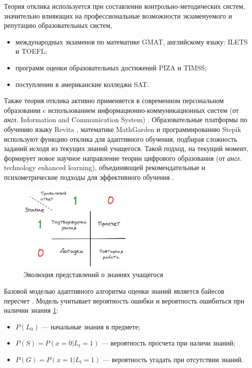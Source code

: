 Теория отклика используется при составлении контрольно-методических систем, значительно влияющих на 
профессиональные возможности экзаменуемого и репутацию образовательных систем,
\begin{itemize}
    \item международных экзаменов по математике GMAT, английскому языку: ILETS и TOEFL;
    \item программ оценки образовательных достижений PIZA и TIMSS;
    \item поступлении в американские колледжи SAT.  
\end{itemize}
Также теория отклика активно применяется  в современном персональном образовании c использованием 
информационно-коммуникационных систем (от \textit{англ.} Information and Communication System)\cite{abbott2003ict}
\cite{manouselis2011recommender}. Образовательные платформы по обучению языку Revita \cite{katinskaia2018revita}, математике
MathGarden \cite{straatemeier2014math} и программированию Stepik используют функцию отклика для адаптивного обучения,
подбирая сложность заданий исходя из текущих знаний учащегося. Такой подход, на текущий момент, формирует 
новое научное направление теории цифрового образования (от \textit{англ.} technology enhanced learning), объединяющей
рекомендательные и психометрические подходы для эффективного обучения \cite{manouselis2011recommender}.
\begin{figure}[h]
    \centering
    \includegraphics[width=0.5\textwidth]{assets/pedagogic/social/bkt.excalidraw.png}
    \caption{Эволюция представлений о знаниях учащегося}
    \label{bkt}
\end{figure}
Базовой моделью адаптивного алгоритма оценки знаний является байесов пересчет \cite{corbett1994knowledge}.
Модель учитывает вероятность ошибки и вероятность ошибиться при наличии знания \ref{bkt}: 
\begin{itemize}
    \item $P(L_0)$ --- начальные знания в предмете;
    \item $P(S) = P(x=0| L_t = 1)$ --- вероятность просчета при наличи знаний;
    \item  $P(G) = P(x=1| L_t = 1)$ --- вероятность угадать при отсутствии знаний.
\end{itemize}
